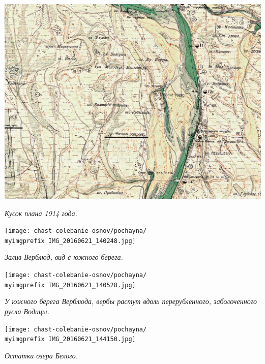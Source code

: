 \begin{center}
\includegraphics[width=\linewidth]{chast-colebanie-osnov/pochayna/itsunsrc.jpg}

\textit{Кусок плана 1914 года.}
\end{center}










\newpage

\begin{center}
\texttt{[image: chast-colebanie-osnov/pochayna/\\myimgprefix IMG\_20160621\_140248.jpg]}

\textit{Залив Верблюд, вид с южного берега.}
\end{center}

\begin{center}
\texttt{[image: chast-colebanie-osnov/pochayna/\\myimgprefix IMG\_20160621\_140528.jpg]}

\textit{У южного берега Верблюда, вербы растут вдоль перерубленного, заболоченного русла Водицы.}
\end{center}

\newpage

\begin{center}
\texttt{[image: chast-colebanie-osnov/pochayna/\\myimgprefix IMG\_20160621\_144150.jpg]}

\textit{Остатки озера Белого.}
\end{center}


